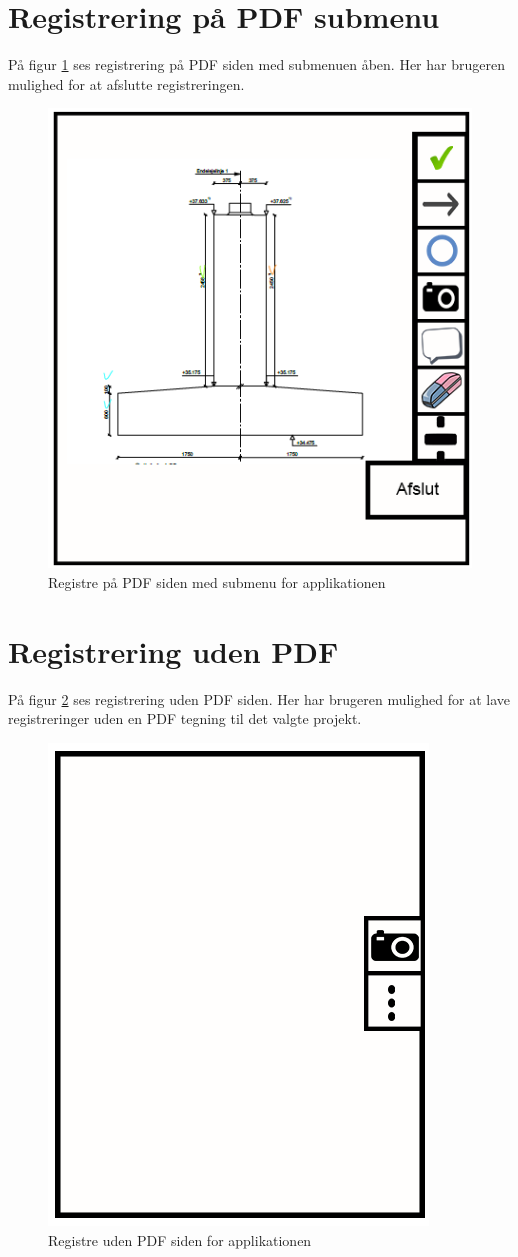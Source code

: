 \section{Registrering på PDF submenu}\label{sec:RegPaaPDFSubMock}
På figur \ref{fig:RegPaaPDFSubMock} ses registrering på PDF siden med submenuen åben. Her har brugeren mulighed for at afslutte registreringen.

\begin{figure}[H]
	\centering
	\includegraphics[width=0.4\linewidth]{MockUps/Mock/Ramboell-PDF-Reg-sub}
	\caption{Registre på PDF siden med submenu for applikationen}
	\label{fig:RegPaaPDFSubMock}
\end{figure}

\clearpage

\section{Registrering uden PDF}\label{sec:RegUdenPDFMock}
På figur \ref{fig:RegUdenPDFMock} ses registrering uden PDF siden. Her har brugeren mulighed for at lave registreringer uden en PDF tegning til det valgte projekt.

\begin{figure}[H]
	\centering
	\includegraphics[width=0.4\linewidth]{MockUps/Mock/Ramboell-TilsynUden}
	\caption{Registre uden PDF siden for applikationen}
	\label{fig:RegUdenPDFMock}
\end{figure}


